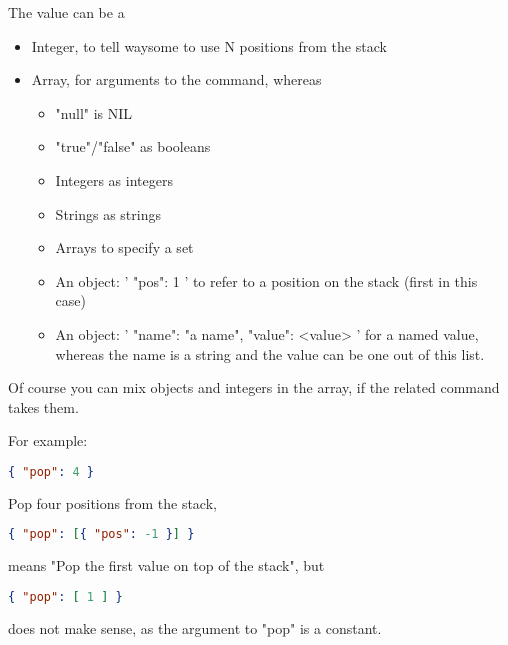         The value can be a

        \begin{itemize}
            \item Integer, to tell waysome to use N positions from the stack

            \item Array, for arguments to the command, whereas

            \begin{itemize}
                \item "null" is NIL
                \item "true"/"false" as booleans
                \item Integers as integers
                \item Strings as strings
                \item Arrays to specify a set
                \item An object: '{ "pos": 1 }' to refer to a position on the
                    stack (first in this case)
                \item An object: '{ "name": "a name", "value": <value> }' for a
                    named value, whereas the name is a string and the value can
                    be one out of this list.
            \end{itemize}
        \end{itemize}

        Of course you can mix objects and integers in the array, if the related
        command takes them.

        For example:

        \begin{lstlisting}[language=json]
            { "pop": 4 }
        \end{lstlisting}

        Pop four positions from the stack,

        \begin{lstlisting}[language=json]
            { "pop": [{ "pos": -1 }] }
        \end{lstlisting}

        means "Pop the first value on top of the stack", but

        \begin{lstlisting}[language=json]
            { "pop": [ 1 ] }
        \end{lstlisting}

        does not make sense, as the argument to "pop" is a constant.

